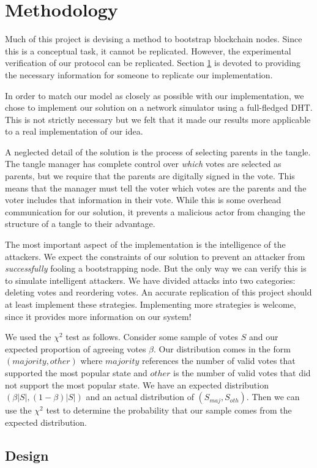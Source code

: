 \section{Methodology}
\label{sec:methodology}


Much of this project is devising a method to bootstrap blockchain nodes.
Since this is a conceptual task, it cannot be replicated.
However, the experimental verification of our protocol can be replicated.
Section \ref{sec:methodology} is devoted to providing the necessary information for someone to replicate our implementation.


In order to match our model as closely as possible with our implementation, we chose to implement our solution on a network simulator using a full-fledged DHT.
This is not strictly necessary but we felt that it made our results more applicable to a real implementation of our idea.


A neglected detail of the solution is the process of selecting parents in the tangle.
The tangle manager has complete control over \textit{which} votes are selected as parents, but we require that the parents are digitally signed in the vote.
This means that the manager must tell the voter which votes are the parents and the voter includes that information in their vote.
While this is some overhead communication for our solution, it prevents a malicious actor from changing the structure of a tangle to their advantage.


The most important aspect of the implementation is the intelligence of the attackers.
We expect the constraints of our solution to prevent an attacker from \textit{successfully} fooling a bootstrapping node.
But the only way we can verify this is to simulate intelligent attackers.
We have divided attacks into two categories: deleting votes and reordering votes.
An accurate replication of this project should at least implement these strategies.
Implementing more strategies is welcome, since it provides more information on our system!


We used the $\chi ^2$ test as follows.
Consider some sample of votes $S$ and our expected proportion of agreeing votes $\beta$.
Our distribution comes in the form $(majority, other)$ where $majority$ references the number of valid votes that supported the most popular state and $other$ is the number of valid votes that did not support the most popular state.
We have an expected distribution $(\beta|S|, (1-\beta)|S|)$ and an actual distribution of $(S_{maj}, S_{oth})$.
Then we can use the $\chi ^2$ test to determine the probability that our sample comes from the expected distribution.

\subsection{Design}


